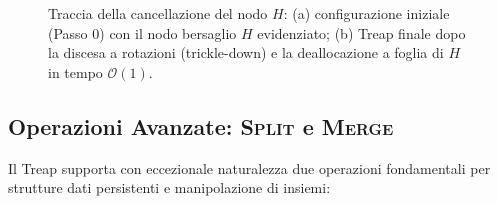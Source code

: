 \begin{figure}[H]
{%
}
\caption{Traccia della cancellazione del nodo $H$: (a) configurazione iniziale (Passo 0) con il nodo bersaglio $H$ evidenziato; (b) Treap finale dopo la discesa a rotazioni (trickle-down) e la deallocazione a foglia di $H$ in tempo $\mathcal{O}(1)$.}
\label{fig:treap-delete-trace}
\end{figure}

\FloatBarrier
\subsection{Operazioni Avanzate: \textsc{Split} e \textsc{Merge}}
Il Treap supporta con eccezionale naturalezza due operazioni fondamentali per strutture dati persistenti e manipolazione di insiemi:

